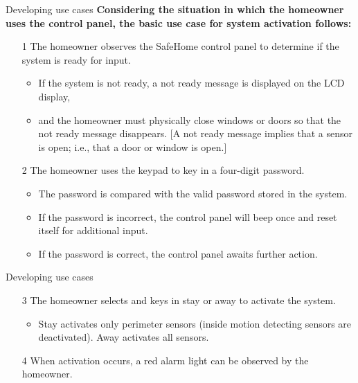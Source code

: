 \documentclass{beamer}
\begin{document}
\begin{frame}{Developing use cases}
	\textbf{Considering the situation in which the homeowner uses the control panel, the
		basic use case for system activation follows:
	}
	\begin{itemize}
		\item[1] The homeowner observes the SafeHome control panel  to determine
		if the system is ready for input.
		\begin{itemize}
			\item If the system is not ready, a not ready message is
			displayed on the LCD display,
			\item and the homeowner must physically close windows
			or doors so that the not ready message disappears. [A not ready message implies
			that a sensor is open; i.e., that a door or window is open.]
		\end{itemize} 
		\item[2] The homeowner uses the keypad to key in a four-digit password.
		\begin{itemize}
			\item  The password is
			compared with the valid password stored in the system.
			\item If the password is incorrect,
			the control panel will beep once and reset itself for additional input.
			\item If the
			password is correct, the control panel awaits further action.
		\end{itemize}  
		
		
	\end{itemize}
	
\end{frame}
\begin{frame}{Developing use cases}
	\begin{itemize}
		\item[3] The homeowner selects and keys in stay or away  to activate the
		system. 
		\begin{itemize}
			\item Stay activates only perimeter sensors (inside motion detecting sensors are
			deactivated). Away activates all sensors.
		\end{itemize}
		\item[4] When activation occurs, a red alarm light can be observed by the homeowner.
	\end{itemize}
	
\end{frame}
\end{document}
